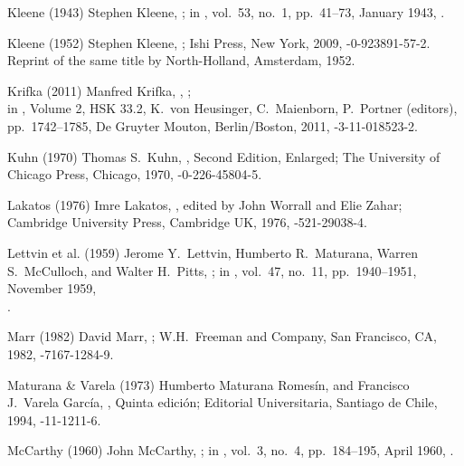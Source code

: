 \biblabel Kleene (1943)
Stephen Kleene,
;
in ,
vol.\ 53, no.\ 1, pp.\ 41--73, January 1943,
.

\biblabel Kleene (1952)
Stephen Kleene,
;
Ishi Press, New York, 2009,
-0-923891-57-2.
Reprint of the same title by
North-Holland, Amsterdam, 1952.

\biblabel Krifka (2011)
Manfred Krifka,
,
;\\
in ,
 Volume 2, HSK 33.2,
 K.\ von Heusinger, C.\ Maienborn, P.\ Portner (editors),
pp.\ 1742--1785,
De Gruyter Mouton, Berlin/Boston, 2011,
-3-11-018523-2.

\biblabel Kuhn (1970)
Thomas S.\ Kuhn,
,
Second Edition, Enlarged;
The University of Chicago Press, Chicago, 1970,
-0-226-45804-5.

\biblabel Lakatos (1976)
Imre Lakatos,
,
edited by John Worrall and Elie Zahar;
Cambridge University Press, Cambridge UK, 1976,
-521-29038-4.

\biblabel Lettvin et al. (1959)
Jerome Y.\ Lettvin, Humberto R.\ Maturana,
Warren S.\ McCulloch, and Walter H.\ Pitts,
;
in ,
vol.\ 47, no.\ 11, pp.\ 1940--1951, November 1959,\\
.

\biblabel Marr (1982)
David Marr,
;
W.H.\ Freeman and Company, San Francisco, CA, 1982,
-7167-1284-9.

\biblabel Maturana \& Varela (1973)
Humberto Maturana Romesín, and
Francisco J.\ Varela García,
,
Quinta edición; Editorial Universitaria, Santiago de Chile, 1994,
-11-1211-6.

\biblabel McCarthy (1960)
John McCarthy,
;
in ,
vol.\ 3, no.\ 4, pp.\ 184--195, April 1960,
.

